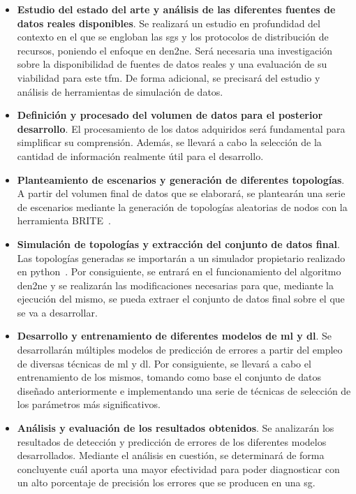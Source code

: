 \begin{itemize}
    \item \textbf{Estudio del estado del arte y análisis de las diferentes fuentes de datos reales disponibles}. Se realizará un estudio en profundidad del contexto en el que se engloban las \gls{sg}s y los protocolos de distribución de recursos, poniendo el enfoque en \gls{den2ne}. Será necesaria una investigación sobre la disponibilidad de fuentes de datos reales y una evaluación de su viabilidad para este \gls{tfm}. De forma adicional, se precisará del estudio y análisis de herramientas de simulación de datos.
    \pagebreak
    \item \textbf{Definición y procesado del volumen de datos para el posterior desarrollo}. El procesamiento de los datos adquiridos será fundamental para simplificar su comprensión. Además, se llevará a cabo la selección de la cantidad de información realmente útil para el desarrollo.    

    \item \textbf{Planteamiento de escenarios y generación de diferentes topologías}. A partir del volumen final de datos que se elaborará, se plantearán una serie de escenarios mediante la generación de topologías aleatorias de nodos con la herramienta BRITE~\cite{brite}.
    
    \item \textbf{Simulación de topologías y extracción del conjunto de datos final}. Las topologías generadas se importarán a un simulador propietario realizado en python~\cite{gitbrite}. Por consiguiente, se entrará en el funcionamiento del algoritmo \gls{den2ne} y se realizarán las modificaciones necesarias para que, mediante la ejecución del mismo, se pueda extraer el conjunto de datos final sobre el que se va a desarrollar.
    
    \item \textbf{Desarrollo y entrenamiento de diferentes modelos de \gls{ml} y \gls{dl}}. Se desarrollarán múltiples modelos de predicción de errores a partir del empleo de diversas técnicas de \gls{ml} y \gls{dl}. Por consiguiente, se llevará a cabo el entrenamiento de los mismos, tomando como base el conjunto de datos diseñado anteriormente e implementando una serie de técnicas de selección de los parámetros más significativos.
    
    \item \textbf{Análisis y evaluación de los resultados obtenidos}. Se analizarán los resultados de detección y predicción de errores de los diferentes modelos desarrollados. Mediante el análisis en cuestión, se determinará de forma concluyente cuál aporta una mayor efectividad para poder diagnosticar con un alto porcentaje de precisión los errores que se producen en una \gls{sg}.
    
\end{itemize}

